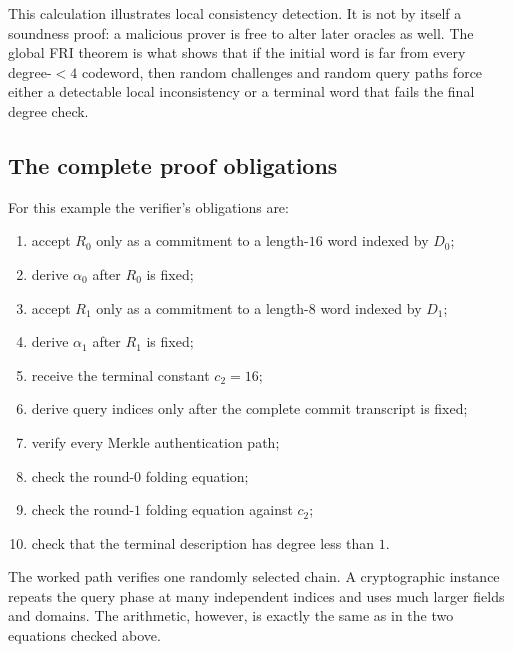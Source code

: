 This calculation illustrates local consistency detection. It is not by itself a soundness
proof: a malicious prover is free to alter later oracles as well. The global FRI theorem is
what shows that if the initial word is far from every degree-$<4$ codeword, then random
challenges and random query paths force either a detectable local inconsistency or a terminal
word that fails the final degree check.

\subsection{The complete proof obligations}

For this example the verifier's obligations are:
\begin{enumerate}[leftmargin=2em]
    \item accept $R_0$ only as a commitment to a length-$16$ word indexed by $D_0$;
    \item derive $\alpha_0$ after $R_0$ is fixed;
    \item accept $R_1$ only as a commitment to a length-$8$ word indexed by $D_1$;
    \item derive $\alpha_1$ after $R_1$ is fixed;
    \item receive the terminal constant $c_2=16$;
    \item derive query indices only after the complete commit transcript is fixed;
    \item verify every Merkle authentication path;
    \item check the round-$0$ folding equation;
    \item check the round-$1$ folding equation against $c_2$;
    \item check that the terminal description has degree less than $1$.
\end{enumerate}

The worked path verifies one randomly selected chain. A cryptographic instance repeats the
query phase at many independent indices and uses much larger fields and domains. The
arithmetic, however, is exactly the same as in the two equations checked above.

